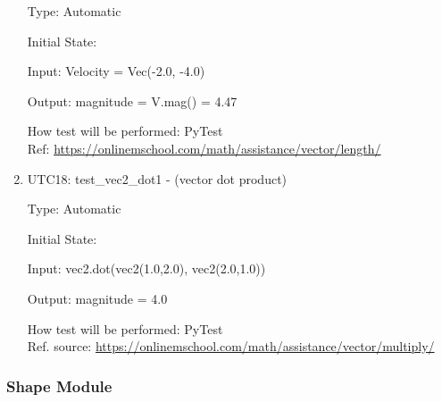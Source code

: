 \documentclass[12pt, titlepage]{article}
\begin{document}
\begin{enumerate}
	Type: Automatic
	
	Initial State: 
	
	Input: Velocity = Vec(-2.0, -4.0)
	
	Output: magnitude = V.mag() = 4.47
	
	How test will be performed: PyTest\\
	Ref: \url{https://onlinemschool.com/math/assistance/vector/length/}
	
	\item{UTC18}{: test\_vec2\_dot1 - (vector dot product)\\}
	
	Type: Automatic
	
	Initial State: 
	
	Input: vec2.dot(vec2(1.0,2.0), vec2(2.0,1.0))
	
	Output: magnitude = 4.0
	
	How test will be performed: PyTest\\
	Ref. source: \url{https://onlinemschool.com/math/assistance/vector/multiply/}
	
	
\end{enumerate}

\subsubsection{Shape Module}
\end{document}
